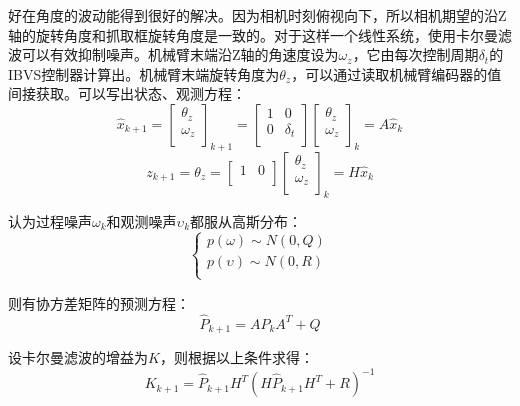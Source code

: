 \documentclass[fontset=fandol,type=bachelor,campus=harbin]{hithesisbook}
\begin{document}
好在角度的波动能得到很好的解决。因为相机时刻俯视向下，所以相机期望的沿Z轴的旋转角度和抓取框旋转角度是一致的。对于这样一个线性系统，使用卡尔曼滤波可以有效抑制噪声。机械臂末端沿Z轴的角速度设为$\omega_z$，它由每次控制周期$\delta _t$的IBVS控制器计算出。机械臂末端旋转角度为$\theta_z$，可以通过读取机械臂编码器的值间接获取。可以写出状态、观测方程：
\begin{equation}
\hat{x}_{k+1}=\left[ \begin{array}{c}
	\theta _z\\
	\omega _z\\
\end{array} \right] _{k+1}=\left[ \begin{matrix}
	1&		0\\
	0&		\delta _t\\
\end{matrix} \right] \left[ \begin{array}{c}
	\theta _z\\
	\omega _z\\
\end{array} \right] _k=A\hat{x}_k
\label{状态方程}
\end{equation}
\begin{equation}
z_{k+1}=\theta _z=\left[ \begin{matrix}
	1&		0\\
\end{matrix} \right] \left[ \begin{array}{c}
	\theta _z\\
	\omega _z\\
\end{array} \right] _k=H\hat{x}_k
\label{观测方程}
\end{equation}


认为过程噪声$\omega_k$和观测噪声$\upsilon_k$都服从高斯分布：
\begin{equation}
\left\{ \begin{array}{c}
	p\left( \omega \right) \sim N\left( 0,Q \right)\\
	p\left( \upsilon \right) \sim N\left( 0,R \right)\\
\end{array} \right. 
\label{噪声分布}
\end{equation}


则有协方差矩阵的预测方程：
\begin{equation}
\hat{P}_{k+1}=AP_kA^T+Q
\label{协方差预测}
\end{equation}


设卡尔曼滤波的增益为$K$，则根据以上条件求得：
\begin{equation}
K_{k+1}=\hat{P}_{k+1}H^T\left( H\hat{P}_{k+1}H^T+R \right) ^{-1}
\label{卡尔曼滤波的增益}
\end{equation}
\end{document}
